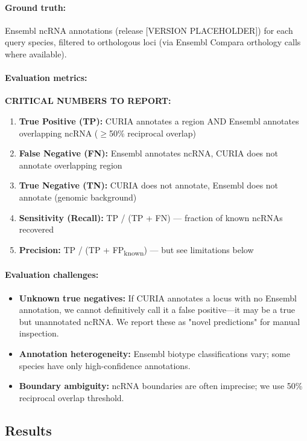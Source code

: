 \documentclass[11pt]{article}
\begin{document}
\paragraph{Ground truth:} Ensembl ncRNA annotations (release [VERSION PLACEHOLDER]) for each query species, filtered to orthologous loci (via Ensembl Compara orthology calls where available).

\paragraph{Evaluation metrics:}
\textbf{CRITICAL NUMBERS TO REPORT:}
\begin{enumerate}
\item \textbf{True Positive (TP):} CURIA annotates a region AND Ensembl annotates overlapping ncRNA ($\geq$50\% reciprocal overlap)
\item \textbf{False Negative (FN):} Ensembl annotates ncRNA, CURIA does not annotate overlapping region
\item \textbf{True Negative (TN):} CURIA does not annotate, Ensembl does not annotate (genomic background)
\item \textbf{Sensitivity (Recall):} TP / (TP + FN) — fraction of known ncRNAs recovered
\item \textbf{Precision:} TP / (TP + FP\textsubscript{known}) — but see limitations below
\end{enumerate}

\paragraph{Evaluation challenges:}
\begin{itemize}
\item \textbf{Unknown true negatives:} If CURIA annotates a locus with no Ensembl annotation, we cannot definitively call it a false positive—it may be a true but unannotated ncRNA. We report these as "novel predictions" for manual inspection.
\item \textbf{Annotation heterogeneity:} Ensembl biotype classifications vary; some species have only high-confidence annotations.
\item \textbf{Boundary ambiguity:} ncRNA boundaries are often imprecise; we use 50\% reciprocal overlap threshold.
\end{itemize}

\subsection{Results}
\end{document}

